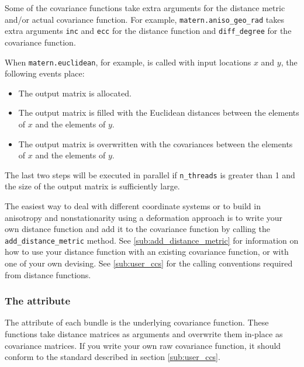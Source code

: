 \documentclass[]{manual}
\begin{document}
Some of the covariance functions take extra arguments for the distance metric and/or actual covariance function. For example, \texttt{matern.aniso_geo_rad} takes extra arguments \texttt{inc} and \texttt{ecc} for the distance function and \texttt{diff_degree} for the covariance function.

When \texttt{matern.euclidean}, for example, is called with input locations $x$ and $y$, the following events place:
\begin{itemize}
	\item The output matrix is allocated.
	\item The output matrix is filled with the Euclidean distances between the elements of $x$ and the elements of $y$.
	\item The output matrix is overwritten with the covariances between the elements of $x$ and the elements of $y$.
\end{itemize}
The last two steps will be executed in parallel if \texttt{n_threads} is greater than 1 and the size of the output matrix is sufficiently large.

The easiest way to deal with different coordinate systems or to build in anisotropy and nonstationarity using a deformation approach \cite{sampson} is to write your own distance function and add it to the covariance function by calling the \texttt{add_distance_metric} method. See \ref{sub:add_distance_metric} for information on how to use your distance function with an existing covariance function, or with one of your own devising. See \ref{sub:user_ccs} for the calling conventions required from distance functions.

\subsubsection{The  attribute}\label{sub:raw}
The  attribute of each bundle is the underlying covariance function. These functions take distance matrices as arguments and overwrite them in-place as covariance matrices. If you write your own raw covariance function, it should conform to the standard described in section \ref{sub:user_ccs}.
\end{document}
